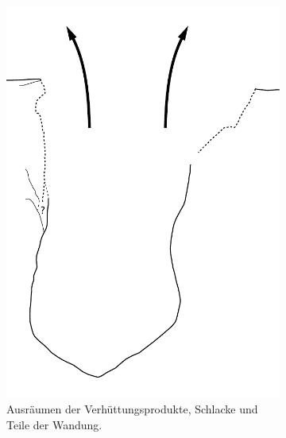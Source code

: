 \begin{figure}[!tb]
\begin{subfigure}[t]{0.32\textwidth}
		\includegraphics[width = \textwidth, page = 5]{fig/MUN87-211_Ablauf.pdf}
		\caption{Ausräumen der Verhüttungsprodukte, Schlacke und Teile der Wandung.}
		\label{fig:MUN87.2-1-1_Sequenz_Skizze_05}
	\end{subfigure}\hspace{2mm}
	\begin{subfigure}[t]{0.32\textwidth}

\end{subfigure}
\end{figure}
